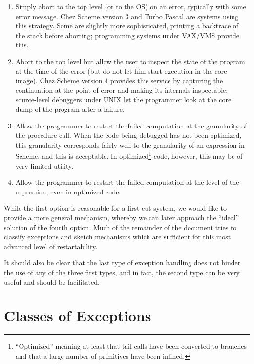 \begin{enumerate}

\item 
Simply abort to the top level (or to the OS) on an error, typically with
some error message. Chez Scheme version 3 and Turbo Pascal are systems
using this strategy. Some are slightly more sophisticated, printing a
backtrace of the stack before aborting; programming systems under VAX/VMS
provide this.

\item
Abort to the top level but allow the user to inspect the state of the
program at the time of the error (but do not let him start execution
in the core image). Chez Scheme version 4 provides this service by
capturing the continuation at the point of error and making its internals
inspectable; source-level debuggers under UNIX let the programmer look
at the core dump of the program after a failure.

\item
Allow the programmer to restart the failed computation at the
granularity of the procedure call. When the code being debugged has
not been optimized, this granularity corresponds fairly well to the
granularity of an expression in Scheme, and this is acceptable. In
optimized\footnote{``Optimized'' meaning at least that tail calls have been
converted to branches and that a large number of primitives have been
inlined.} code, however, this may be of very limited utility.

\item
Allow the programmer to restart the failed computation at the level
of the expression, even in optimized code.

\end{enumerate}

While the first option is reasonable for a first-cut system, we would
like to provide a more general mechanism, whereby we can later
approach the ``ideal'' solution of the fourth option. Much of the
remainder of the document tries to classify exceptions and sketch
mechanisms which are sufficient for this most advanced level of
restartability.

It should also be clear that the last type of exception handling does not
hinder the use of any of the three first types, and in fact, the second
type can be very useful and should be facilitated.

\section{Classes of Exceptions}


